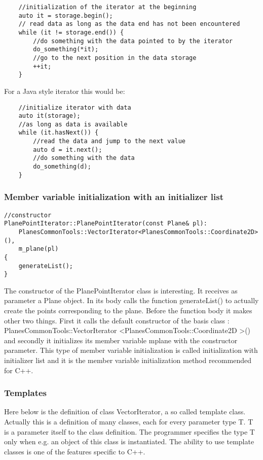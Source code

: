 \begin{lstlisting}
	//initialization of the iterator at the beginning
	auto it = storage.begin();    
	// read data as long as the data end has not been encountered	
	while (it != storage.end()) {  
		//do something with the data pointed to by the iterator		
		do_something(*it);   
		//go to the next position in the data storage 
   		++it;   
	}
\end{lstlisting}

For a Java style iterator this would be:

\begin{lstlisting}
	//initialize iterator with data	
	auto it(storage);     
	//as long as data is available    
	while (it.hasNext()) { 
		//read the data and jump to the next value
		auto d = it.next();  
		//do something with the data
        do_something(d);  
    }
\end{lstlisting}
\subsubsection {Member variable initialization with an initializer list}

\begin{lstlisting}
//constructor
PlanePointIterator::PlanePointIterator(const Plane& pl):
    PlanesCommonTools::VectorIterator<PlanesCommonTools::Coordinate2D>(),
    m_plane(pl)
{
    generateList();
}
\end{lstlisting}

The constructor of the PlanePointIterator class is interesting. It receives as parameter a Plane object. In its body calls the function generateList() to actually create the points corresponding to the plane. Before the function body it makes other two things. First it calls the default constructor of the basis class : PlanesCommonTools::VectorIterator \textless PlanesCommonTools::Coordinate2D \textgreater() and secondly it initializes its member variable m\textunderscore plane with the constructor parameter. This type of member variable initialization is called initialization with initializer list and it is the member variable initialization method recommended for C++. 

\subsubsection {Templates}

Here below is the definition of class VectorIterator, a so called template class. Actually this is a definition of many classes, each for every parameter type T. T is a parameter itself to the class definition. The programmer specifies the type T only when e.g. an object of this class is instantiated. The ability to use template classes is one of the features specific to C++.

